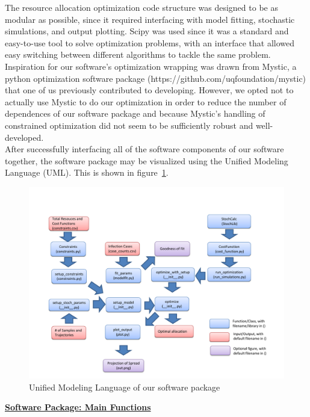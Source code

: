 \documentclass[11pt,letter]{article}
\begin{document}
The resource allocation optimization code structure was designed to be as modular as possible, since it required interfacing with model fitting, stochastic simulations, and output plotting. Scipy was used since it was a standard and easy-to-use tool to solve optimization problems, with an interface that allowed easy switching between different algorithms to tackle the same problem. Inspiration for our software's optimization wrapping was drawn from Mystic, a python optimization software package (https://github.com/uqfoundation/mystic) that one of us previously contributed to developing. However, we opted not to actually use Mystic to do our optimization in order to reduce the number of dependences of our software package and because Mystic's handling of constrained optimization did not seem to be sufficiently robust and well-developed. \\

After successfully interfacing all of the software components of our software together, the software package may be visualized using the Unified Modeling Language (UML). This is shown in figure~\ref{fig:UML}.
\begin{figure}
\centering
\includegraphics[width=16cm]{Design_FlowChart.pdf}
\caption{Unified Modeling Language of our software package}
\label{fig:UML}
\end{figure}

\underline{\textbf{Software Package: Main Functions}}\\
\end{document}
